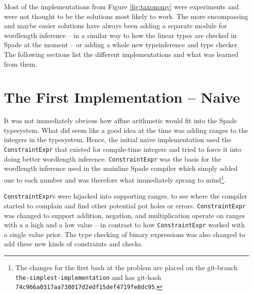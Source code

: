 Most of the implementations from Figure \ref{fig:taxonomy} were experiments and were not thought to be the solutions most likely to work. The more encompassing and maybe easier solutions have always been adding a separate module for wordlength inference -- in a similar way to how the linear types are checked in Spade at the moment -- or adding a whole new typeinference and type checker. The following sections list the different implementations and what was learned from them.


\section{The First Implementation -- Naive}
\label{sec:First}

It was not immediately obvious how affine arithmetic would fit into the Spade typesystem. What did seem like a good idea at the time was adding ranges to the integers in the typesystem. Hence, the initial naive implementation used the \verb+ConstraintExpr+ that existed for compile-time integers and tried to force it into doing better wordlength inference. \verb+ConstraintExpr+ was the basis for the wordlength inference used in the mainline Spade compiler which simply added one to each number and was therefore what immediately sprang to mind\cprotect\footnote{The changes for the first bash at the problem are placed on the git-branch \verb+the-simplest-implementation+ and has git-hash \verb+74c966a0317aa738017d2edf15def4719fe8dc95+.}.


\verb+ConstraintExpr+s were hijacked into supporting ranges, to see where the compiler started to complain and find other potential pot holes or errors. \verb+ConstraintExpr+ was changed to support addition, negation, and multiplication operate on ranges with a a high and a low value -- in contrast to how \verb+ConstraintExpr+ worked with a single value prior. The type checking of binary expressions was also changed to add these new kinds of constraints and checks.

